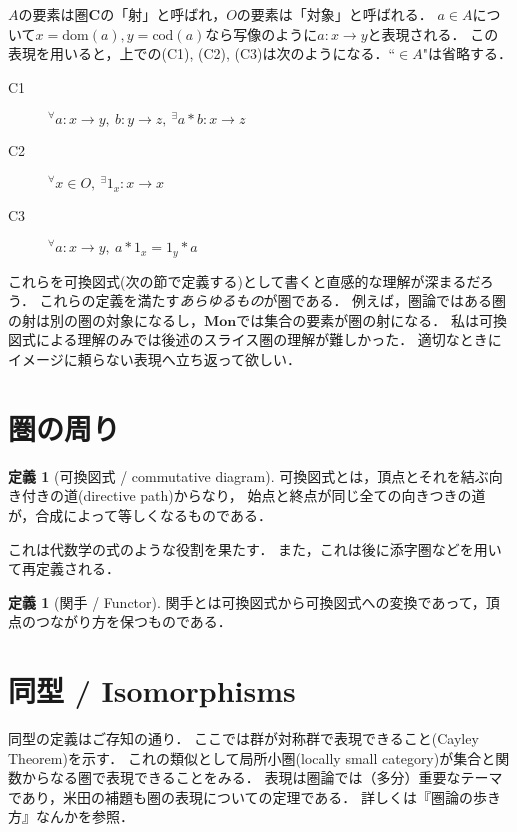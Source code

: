 \documentclass[a4j]{jarticle}
\newcommand {\cat}[1]{%
\mathbf{#1}%
}
\newcommand {\dom}[1]{%
\mathrm{dom}(#1)%
}
\newcommand {\cod}[1]{%
\mathrm{cod}(#1)%
}
\newcommand {\idarrow}[1]{%
1_{#1}%
}
\theoremstyle{definition}
\newtheorem{definition}[theorem]{定義}
\begin{document}
        $A$の要素は圏$\cat{C}$の「射」と呼ばれ，$O$の要素は「対象」と呼ばれる．
        $a \in A$について$x=\dom{a}, y=\cod{a}$なら写像のように$a:x \rightarrow y$と表現される．
        この表現を用いると，上での(C1), (C2), (C3)は次のようになる．``$\in A$"は省略する． %
        \begin{description}
            \item[C1]
            $^\forall a: x \rightarrow y,~ b: y \rightarrow z,~ ^\exists a \ast b: x \rightarrow z$

            \item[C2]
                $^\forall {x} \in O,~ ^\exists \idarrow{x}: x \rightarrow x$

            \item[C3]
                $ ^\forall a: x \rightarrow y,~ a \ast \idarrow{x} = \idarrow{y} \ast a $
        \end{description}

        これらを可換図式(次の節で定義する)として書くと直感的な理解が深まるだろう．
        これらの定義を満たす{\it あらゆるもの}が圏である．
        例えば，圏論ではある圏の射は別の圏の対象になるし，$\cat{Mon}$では集合の要素が圏の射になる．
        私は可換図式による理解のみでは後述のスライス圏の理解が難しかった．
        適切なときにイメージに頼らない表現へ立ち返って欲しい．

    \section{圏の周り}
        \begin{definition}[可換図式 / commutative diagram]
            可換図式とは，頂点とそれを結ぶ向き付きの道(directive path)からなり，
            始点と終点が同じ全ての向きつきの道が，合成によって等しくなるものである．
        \end{definition}

        これは代数学の式のような役割を果たす．
        また，これは後に添字圏などを用いて再定義される． %

        \begin{definition}[関手 / Functor]
            関手とは可換図式から可換図式への変換であって，頂点のつながり方を保つものである．
        \end{definition}

    \section{同型 / Isomorphisms}
        同型の定義はご存知の通り．
        ここでは群が対称群で表現できること(Cayley Theorem)を示す．
        これの類似として局所小圏(locally small category)が集合と関数からなる圏で表現できることをみる．
        表現は圏論では（多分）重要なテーマであり，米田の補題も圏の表現についての定理である．
        詳しくは『圏論の歩き方』なんかを参照．
\end{document}
